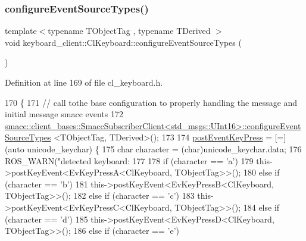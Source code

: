 \subsubsection{\texorpdfstring{configure\+Event\+Source\+Types()}{configureEventSourceTypes()}}
{\footnotesize\ttfamily template$<$typename T\+Object\+Tag , typename T\+Derived $>$ \\
void keyboard\+\_\+client\+::\+Cl\+Keyboard\+::configure\+Event\+Source\+Types (\begin{DoxyParamCaption}{ }\end{DoxyParamCaption})\hspace{0.3cm}{\ttfamily [inline]}}



Definition at line 169 of file cl\+\_\+keyboard.\+h.


\begin{DoxyCode}
170         \{
171                 \textcolor{comment}{// call tothe base configuration to properly handling the message and initial message smacc
       events}
172                 
      \hyperlink{classsmacc_1_1client__bases_1_1SmaccSubscriberClient}{smacc::client\_bases::SmaccSubscriberClient<std\_msgs::UInt16>::configureEventSourceTypes}
      <TObjectTag, TDerived>();
173 
174                 \hyperlink{classkeyboard__client_1_1ClKeyboard_aadd675eea47a012b348a4e6c00e7e9d0}{postEventKeyPress} = [=](\textcolor{keyword}{auto} unicode\_keychar) \{
175                         \textcolor{keywordtype}{char} character = (char)unicode\_keychar.data;
176                         ROS\_WARN(\textcolor{stringliteral}{"detected keyboard: %
177 
178                         \textcolor{keywordflow}{if} (character == \textcolor{charliteral}{'a'})
179                                 this->postKeyEvent<EvKeyPressA<ClKeyboard, TObjectTag>>();
180                         \textcolor{keywordflow}{else} \textcolor{keywordflow}{if} (character == \textcolor{charliteral}{'b'})
181                                 this->postKeyEvent<EvKeyPressB<ClKeyboard, TObjectTag>>();
182                         \textcolor{keywordflow}{else} \textcolor{keywordflow}{if} (character == \textcolor{charliteral}{'c'})
183                                 this->postKeyEvent<EvKeyPressC<ClKeyboard, TObjectTag>>();
184                         \textcolor{keywordflow}{else} \textcolor{keywordflow}{if} (character == \textcolor{charliteral}{'d'})
185                                 this->postKeyEvent<EvKeyPressD<ClKeyboard, TObjectTag>>();
186                         \textcolor{keywordflow}{else} \textcolor{keywordflow}{if} (character == \textcolor{charliteral}{'e'})
}
\end{DoxyCode}
